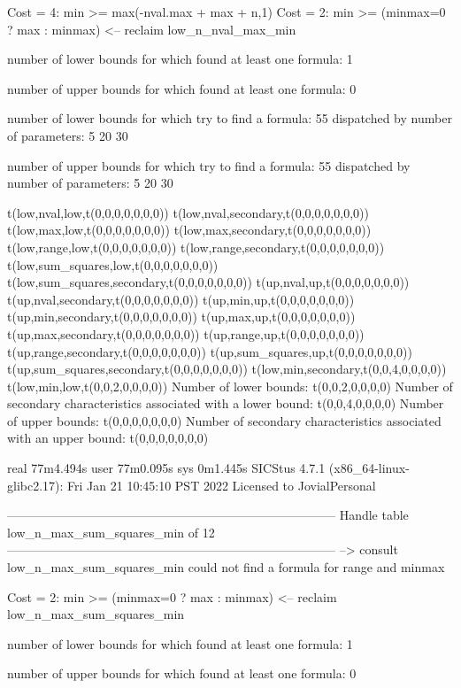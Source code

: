 Cost =  4:  min >= max(-nval.max + max + n,1)
Cost =  2:  min >= (minmax=0 ? max : minmax)
<-- reclaim low_n_nval_max_min

number of lower bounds for which found at least one formula: 1

number of upper bounds for which found at least one formula: 0

number of lower bounds for which try to find a formula: 55
dispatched by number of parameters: 5  20  30

number of upper bounds for which try to find a formula: 55
dispatched by number of parameters: 5  20  30

t(low,nval,low,t(0,0,0,0,0,0,0))
t(low,nval,secondary,t(0,0,0,0,0,0,0))
t(low,max,low,t(0,0,0,0,0,0,0))
t(low,max,secondary,t(0,0,0,0,0,0,0))
t(low,range,low,t(0,0,0,0,0,0,0))
t(low,range,secondary,t(0,0,0,0,0,0,0))
t(low,sum_squares,low,t(0,0,0,0,0,0,0))
t(low,sum_squares,secondary,t(0,0,0,0,0,0,0))
t(up,nval,up,t(0,0,0,0,0,0,0))
t(up,nval,secondary,t(0,0,0,0,0,0,0))
t(up,min,up,t(0,0,0,0,0,0,0))
t(up,min,secondary,t(0,0,0,0,0,0,0))
t(up,max,up,t(0,0,0,0,0,0,0))
t(up,max,secondary,t(0,0,0,0,0,0,0))
t(up,range,up,t(0,0,0,0,0,0,0))
t(up,range,secondary,t(0,0,0,0,0,0,0))
t(up,sum_squares,up,t(0,0,0,0,0,0,0))
t(up,sum_squares,secondary,t(0,0,0,0,0,0,0))
t(low,min,secondary,t(0,0,4,0,0,0,0))
t(low,min,low,t(0,0,2,0,0,0,0))
Number of lower bounds:                                             t(0,0,2,0,0,0,0)
Number of secondary characteristics associated with a lower bound:  t(0,0,4,0,0,0,0)
Number of upper bounds:                                             t(0,0,0,0,0,0,0)
Number of secondary characteristics associated with an upper bound: t(0,0,0,0,0,0,0)

real	77m4.494s
user	77m0.095s
sys	0m1.445s
SICStus 4.7.1 (x86_64-linux-glibc2.17): Fri Jan 21 10:45:10 PST 2022
Licensed to JovialPersonal


--------------------------------------------------------------------------------
Handle table low_n_max_sum_squares_min of 12
--------------------------------------------------------------------------------
--> consult low_n_max_sum_squares_min
could not find a formula for range and minmax

Cost =  2:  min >= (minmax=0 ? max : minmax)
<-- reclaim low_n_max_sum_squares_min

number of lower bounds for which found at least one formula: 1

number of upper bounds for which found at least one formula: 0

